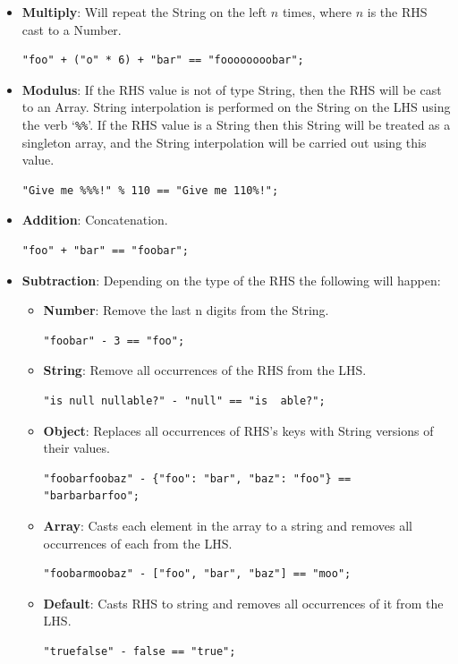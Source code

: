 \documentclass[]{full}
\theoremstyle{definition}
\begin{document}
\begin{itemize}
    \item \textbf{Multiply}: Will repeat the String on the left $n$ times, where $n$ is the RHS cast to a Number.
    \begin{verbatim}
"foo" + ("o" * 6) + "bar" == "foooooooobar";
    \end{verbatim}
    \item \textbf{Modulus}: If the RHS value is not of type String, then the RHS will be cast to an Array. String interpolation is performed on the String on the LHS using the verb `\verb|%%|'. If the RHS value is a String then this String will be treated as a singleton array, and the String interpolation will be carried out using this value.
    \begin{verbatim}
"Give me %%%!" % 110 == "Give me 110%!";
    \end{verbatim}
    \item \textbf{Addition}: Concatenation.
    \begin{verbatim}
"foo" + "bar" == "foobar";
    \end{verbatim}
    \item \textbf{Subtraction}: Depending on the type of the RHS the following will happen:
    \begin{itemize}
        \item \textbf{Number}:  Remove the last n digits from the String.
        \begin{verbatim}
"foobar" - 3 == "foo";
        \end{verbatim}
        \item \textbf{String}:  Remove all occurrences of the RHS from the LHS.
        \begin{verbatim}
"is null nullable?" - "null" == "is  able?";
        \end{verbatim}
        \item \textbf{Object}:  Replaces all occurrences of RHS's keys with String versions of their values.
        \begin{verbatim}
"foobarfoobaz" - {"foo": "bar", "baz": "foo"} == "barbarbarfoo";
        \end{verbatim}
        \item \textbf{Array}:   Casts each element in the array to a string and removes all occurrences of each from the LHS.
        \begin{verbatim}
"foobarmoobaz" - ["foo", "bar", "baz"] == "moo";
        \end{verbatim}
        \item \textbf{Default}: Casts RHS to string and removes all occurrences of it from the LHS.
        \begin{verbatim}
"truefalse" - false == "true";
        \end{verbatim}
    \end{itemize}
\end{itemize}
\end{document}
